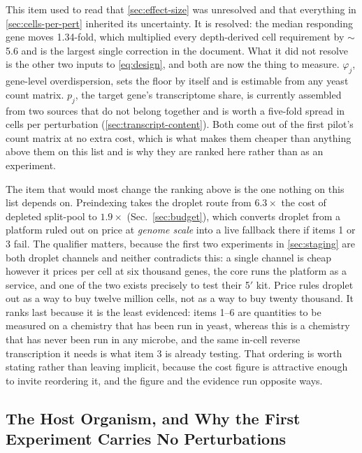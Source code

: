  This item
used to read that \cref{sec:effect-size} was unresolved and that everything in
\cref{sec:cells-per-pert} inherited its uncertainty. It is resolved: the median
responding gene moves 1.34-fold, which multiplied every depth-derived cell
requirement by $\sim$5.6 and is the largest single correction in the document.
What it did not resolve is the other two inputs to \cref{eq:design}, and both are
now the thing to measure. $\varphi_j$, gene-level overdispersion, sets the floor
by itself and is estimable from any yeast count matrix. $p_j$, the target gene's
transcriptome share, is currently assembled from two sources that do not belong
together and is worth a five-fold spread in cells per perturbation
(\cref{sec:transcript-content}). Both come out of the first pilot's count matrix
at no extra cost, which is what makes them cheaper than anything above them on
this list and is why they are ranked here rather than as an experiment.

 The item that would
most change the ranking above is the one nothing on this list depends on.
Preindexing takes the droplet route from $6.3\times$ the cost of depleted
split-pool to $1.9\times$ (Sec.~\ref{sec:budget}), which converts droplet from a
platform ruled out on price at \emph{genome scale} into a live fallback there if
items 1 or 3 fail. The qualifier matters, because the first two experiments in
\cref{sec:staging} are both droplet channels and neither contradicts this: a
single channel is cheap however it prices per cell at six thousand genes, the
core runs the platform as a service, and one of the two exists precisely to test
their 5$'$ kit. Price rules droplet out as a way to buy twelve million cells, not
as a way to buy twenty thousand.
It ranks last because it is the least evidenced: items 1--6 are quantities to be
measured on a chemistry that has been run in yeast, whereas this is a chemistry
that has never been run in any microbe, and the same in-cell reverse
transcription it needs is what item 3 is already testing. That ordering is worth
stating rather than leaving implicit, because the cost figure is attractive
enough to invite reordering it, and the figure and the evidence run opposite
ways.

\subsection{The Host Organism, and Why the First Experiment Carries No
Perturbations}
\label{sec:host}

